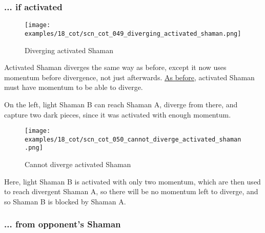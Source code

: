 \clearpage %

\subsubsection*{... if activated}
\label{sec:Conquest of Tlalocan/Divergence/... if activated}

\vspace*{-0.7\baselineskip}
\noindent
\begin{wrapfigure}[12]{l}{0.4\textwidth}
\centering
\texttt{[image: examples/18\_cot/scn\_cot\_049\_diverging\_activated\_shaman.png]}
\vspace*{-0.4\baselineskip}
\caption{Diverging activated Shaman}
\label{fig:scn_cot_049_diverging_activated_shaman}
\end{wrapfigure}
Activated Shaman diverges the same way as before, except it now uses momentum before
divergence, not just afterwards.\newline
\indent
\hyperref[fig:scn_cot_032_diverging_activated_piece_init]{As before}, activated
Shaman must have momentum to be able to diverge.

On the left, light Shaman B can reach Shaman A, diverge from there, and capture
two dark pieces, since it was activated with enough momentum.

\noindent
\begin{wrapfigure}[6]{l}{0.4\textwidth}
\centering
\texttt{[image: examples/18\_cot/scn\_cot\_050\_cannot\_diverge\_activated\_shaman.png]}
\vspace*{-0.4\baselineskip}
\caption{Cannot diverge activated Shaman}
\label{fig:scn_cot_050_cannot_diverge_activated_shaman}
\end{wrapfigure}
Here, light Shaman B is activated with only two momentum, which are then used
to reach divergent Shaman A, so there will be no momentum left to diverge, and
so Shaman B is blocked by Shaman A.

\clearpage %

\subsubsection*{... from opponent's Shaman}
\label{sec:Conquest of Tlalocan/Divergence/... from opponent's Shaman}

